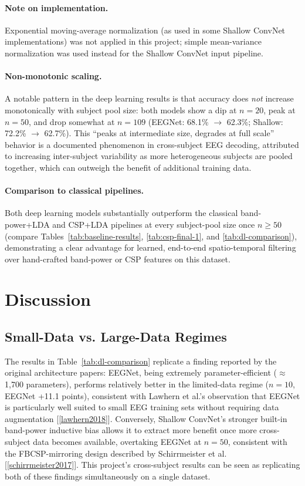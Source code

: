\documentclass[11pt,a4paper]{article}
\renewcommand{\cite}[1]{[\ref{#1}]}
\begin{document}
\paragraph{Note on implementation.} Exponential moving-average normalization (as used in some Shallow ConvNet implementations) was not applied in this project; simple mean-variance normalization was used instead for the Shallow ConvNet input pipeline.

\paragraph{Non-monotonic scaling.} A notable pattern in the deep learning results is that accuracy does \emph{not} increase monotonically with subject pool size: both models show a dip at $n=20$, peak at $n=50$, and drop somewhat at $n=109$ (EEGNet: 68.1\% $\rightarrow$ 62.3\%; Shallow: 72.2\% $\rightarrow$ 62.7\%). This ``peaks at intermediate size, degrades at full scale'' behavior is a documented phenomenon in cross-subject EEG decoding, attributed to increasing inter-subject variability as more heterogeneous subjects are pooled together, which can outweigh the benefit of additional training data.

\paragraph{Comparison to classical pipelines.} Both deep learning models substantially outperform the classical band-power+LDA and CSP+LDA pipelines at every subject-pool size once $n \geq 50$ (compare Tables~\ref{tab:baseline-results}, \ref{tab:csp-final-1}, and \ref{tab:dl-comparison}), demonstrating a clear advantage for learned, end-to-end spatio-temporal filtering over hand-crafted band-power or CSP features on this dataset.

\section{Discussion}

\subsection{Small-Data vs. Large-Data Regimes}
The results in Table~\ref{tab:dl-comparison} replicate a finding reported by the original architecture papers: EEGNet, being extremely parameter-efficient ($\approx$1,700 parameters), performs relatively better in the limited-data regime ($n=10$, EEGNet +11.1 points), consistent with Lawhern et al.'s observation that EEGNet is particularly well suited to small EEG training sets without requiring data augmentation \cite{lawhern2018}. Conversely, Shallow ConvNet's stronger built-in band-power inductive bias allows it to extract more benefit once more cross-subject data becomes available, overtaking EEGNet at $n=50$, consistent with the FBCSP-mirroring design described by Schirrmeister et al. \cite{schirrmeister2017}. This project's cross-subject results can be seen as replicating both of these findings simultaneously on a single dataset.
\end{document}
